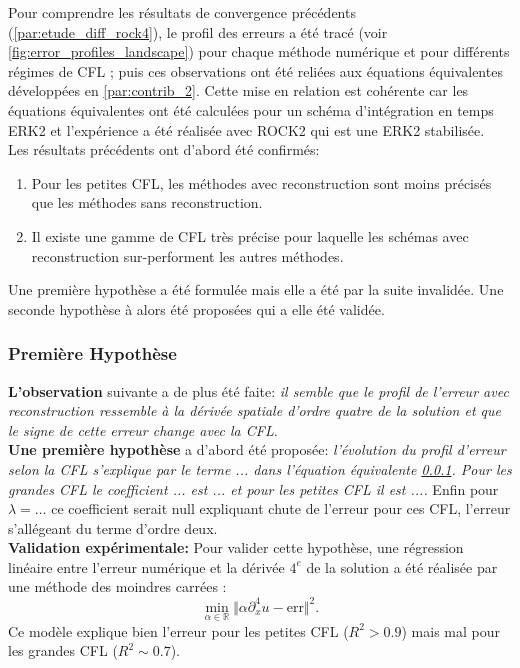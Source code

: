 Pour comprendre les résultats de convergence précédents (\ref{par:etude_diff_rock4}), le profil des erreurs a été tracé (voir \ref{fig:error_profiles_landscape}) pour chaque méthode numérique et pour différents régimes de CFL ; puis 
ces observations ont été reliées aux équations équivalentes développées en \ref{par:contrib_2}. 
Cette mise en relation est cohérente car les équations équivalentes ont été calculées pour un schéma d'intégration en temps ERK2 et l'expérience a été réalisée avec 
ROCK2 qui est une ERK2 stabilisée.\\
Les résultats précédents ont d'abord été confirmés:
\begin{enumerate}
    \item Pour les petites CFL, les méthodes avec reconstruction sont moins précisés que les méthodes sans reconstruction.
    \item Il existe une gamme de CFL très précise pour laquelle les schémas avec reconstruction sur-performent les autres méthodes.
\end{enumerate}
Une première hypothèse a été formulée mais elle a été par la suite invalidée. Une seconde hypothèse à alors été proposées qui a elle été validée.
\subsubsection{Première Hypothèse}
\textbf{L'observation} suivante a de plus été faite: \textit{il semble que le profil de l'erreur avec reconstruction ressemble à la dérivée spatiale d'ordre quatre
de la solution et que le signe de cette erreur change avec la CFL}.\\
\textbf{Une première hypothèse} a d'abord été proposée: \textit{l'évolution du profil d'erreur selon la CFL s'explique par le terme ... dans l'équation équivalente \ref{}.
Pour les grandes CFL le coefficient ... est ... et pour les petites CFL il est ....} Enfin pour $\lambda = \dots$ ce coefficient serait null expliquant 
chute de l'erreur pour ces CFL, l'erreur s'allégeant du terme d'ordre deux.\\
\textbf{Validation expérimentale:} Pour valider cette hypothèse, une régression linéaire entre l'erreur numérique et la dérivée $4^e$ de la solution a été réalisée par 
une méthode des moindres carrées : $$\min_{\alpha \in \mathbb R} \Vert \alpha \partial_x^4 u - \text{err} \Vert^2.$$
Ce modèle explique bien l'erreur pour les petites CFL ($R^2>0.9$) mais mal pour les grandes CFL ($R^2 \sim 0.7$).
